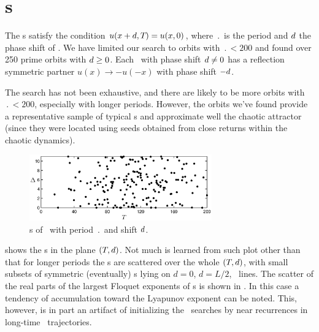 %

\section{\Rpo s}

The \rpo s satisfy the condition $u(x+d,{T_{}}) = u(x,0)$, where $\period{}$
is the period and $d$ the phase shift of \rpo .  We have
limited our search to orbits with $\period{} < 200$ and found over 250 prime
orbits with $d \ge 0$.  Each \rpo\ with phase shift $d \neq 0$
has a reflection symmetric partner $u(x) \to -u(-x)$ with phase shift $-d$.

The search has not been exhaustive, and there are likely to be more
orbits with $\period{} < 200$, especially with longer periods.  However, the
orbits we've found provide a representative sample of typical \rpo s
and approximate well the chaotic attractor (since they were located
using seeds obtained from close returns within the chaotic
dynamics).


\begin{figure}[t]
\begin{center}
\includegraphics[width=0.7\textwidth]{figs/ks22_rpos_Tdelta.eps}
\end{center}
\caption{\Rpo s of \KSe\ with period $\period{}$ and shift $d$.
        } \label{f:ks22rposT}
\end{figure}

 shows the \rpo s in the plane $({T_{}},d)$. Not much
is learned from such plot other than that for longer periods 
the \rpo s are scattered over the whole $({T_{}},d)$, with small
subsets of symmetric (eventually) 
\po s lying on $d=0$, $d=L/2$, \etc\ lines.
%
The scatter of the real parts of the
largest Floquet exponents of \rpo s is shown in
. In this case a tendency of accumulation toward the
Lyapunov exponent
can be noted. This, however, is in part an artifact of initializing
the \rpo\ searches by near recurrences in long-time \statesp\ trajectories.

